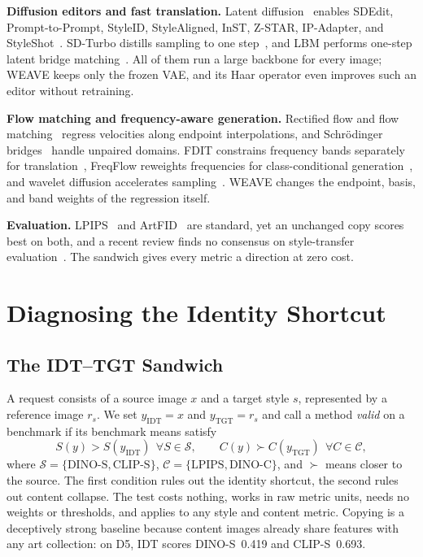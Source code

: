 \documentclass[conference]{IEEEtran}
\newcommand{\dinos}{DINO-S}
\newcommand{\dinoc}{DINO-C}
\newcommand{\clips}{CLIP-S}
\begin{document}
\noindent\textbf{Diffusion editors and fast translation.} Latent diffusion~\cite{rombach2022high} enables
SDEdit, Prompt-to-Prompt, StyleID, StyleAligned, InST, Z-STAR, IP-Adapter, and
StyleShot~\cite{meng2021sdedit,hertz2022prompt,chung2024style,hertz2024style,zhang2023inst,deng2024zstar,ye2023ipadapter,gao2024styleshot}.
SD-Turbo distills sampling to one step~\cite{sauer2023adversarial}, and LBM performs one-step latent
bridge matching~\cite{chadebec2025lbm}. All of them run a large backbone for every image; WEAVE keeps only the
frozen VAE, and its Haar operator even improves such an editor without retraining.

\noindent\textbf{Flow matching and frequency-aware generation.} Rectified flow and flow
matching~\cite{liu2022rectified,lipman2022flow} regress velocities along endpoint interpolations, and
Schr\"odinger bridges~\cite{debortoli2021dsb,shi2023dsbm,liu2023i2sb,su2023ddib} handle unpaired domains.
FDIT constrains frequency bands separately for translation~\cite{cai2021fdit}, FreqFlow reweights
frequencies for class-conditional generation~\cite{ren2026freqflow}, and wavelet diffusion accelerates
sampling~\cite{phung2023wavelet}. WEAVE changes the endpoint, basis, and band weights of the regression itself.

\noindent\textbf{Evaluation.} LPIPS~\cite{zhang2018unreasonable} and ArtFID~\cite{wright2022artfid} are
standard, yet an unchanged copy scores best on both, and a recent review finds no consensus on
style-transfer evaluation~\cite{ioannou2024evaluation}. The sandwich gives every metric a direction at zero cost.

\section{Diagnosing the Identity Shortcut}
\label{sec:diagnosis}

\subsection{The IDT--TGT Sandwich}
A request consists of a source image $x$ and a target style $s$, represented by a reference image $r_s$.
We set $y_{\mathrm{IDT}}=x$ and $y_{\mathrm{TGT}}=r_s$ and call a method \emph{valid} on a benchmark if
its benchmark means satisfy
\begin{equation}
S(y)>S(y_{\mathrm{IDT}})\ \ \forall S\in\mathcal S,\qquad
C(y)\succ C(y_{\mathrm{TGT}})\ \ \forall C\in\mathcal C,
\label{eq:sandwich}
\end{equation}
where $\mathcal S=\{\text{\dinos},\text{\clips}\}$, $\mathcal C=\{\text{LPIPS},\text{\dinoc}\}$, and $\succ$
means closer to the source. The first condition rules out the identity shortcut, the second rules out
content collapse. The test costs nothing, works in raw metric units, needs no weights or thresholds, and
applies to any style and content metric. Copying is a deceptively strong baseline because content images
already share features with any art collection: on D5, IDT scores \dinos{}~0.419 and \clips{}~0.693.
\end{document}
